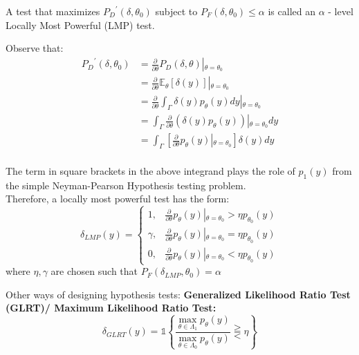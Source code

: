 \documentclass[12pt]{report}
\begin{document}
\begin{defn}
A test that maximizes ${P_D}^\prime(\delta,\theta_0)$ subject to $P_F(\delta,\theta_0) \leq \alpha$ is called an $\alpha$ - level Locally Most Powerful (LMP) test.
\end{defn}

\noindent Observe that:
\begin{align*}
{P_D}^\prime(\delta,\theta_0) &= \frac{\partial}{\partial\theta}P_D(\delta,\theta)\left| {_{\theta = \theta_0}} \right.\\ &= \frac{\partial}{\partial\theta}\mathbb{E}_\theta[\delta(y)]\left| {_{\theta = \theta_0}} \right.\\ &= \frac{\partial}{\partial\theta}\int_{\Gamma}\delta(y)p_\theta(y)dy\left| {_{\theta = \theta_0}} \right.\\ &= \int_{\Gamma}\frac{\partial}{\partial\theta}(\delta(y)p_\theta(y))\left| {_{\theta = \theta_0}} \right.dy\\ &= \int_{\Gamma}\left[\frac{\partial}{\partial\theta}p_\theta(y)\left| {_{\theta = \theta_0}} \right.\right]\delta(y)dy \\
\end{align*}

\noindent The term in square brackets in the above integrand plays the role of $p_1(y)$ from the simple Neyman-Pearson Hypothesis testing problem.
\\
Therefore, a locally most powerful test has the form:
\begin{equation}
\delta_{LMP}(y)=\begin{cases}
 1, & \frac{\partial}{\partial\theta}p_\theta(y)\left| {_{\theta = \theta_0}} \right.>\eta p_{\theta_0}(y)\\
    \gamma, & \frac{\partial}{\partial\theta}p_\theta(y)\left| {_{\theta = \theta_0}} \right.=\eta p_{\theta_0}(y)\\
    0, & \frac{\partial}{\partial\theta}p_\theta(y)\left| {_{\theta = \theta_0}} \right.<\eta p_{\theta_0}(y)
  \end{cases}
\end{equation}
where $\eta, \gamma$ are chosen such that $P_F(\delta_{LMP}, \theta_0) = \alpha$\\

\begin{rem}
Other ways of designing hypothesis tests:
\textbf{Generalized Likelihood Ratio Test (GLRT)/ Maximum Likelihood Ratio Test:}
\begin{equation}
\delta_{GLRT}(y) = \mathds{1} \left\{\frac{\underset{\theta\in\Lambda_1}{\max} p_\theta(y)}{\underset{\theta\in\Lambda_0}{\max} p_\theta(y)} \gtreqqless \eta\right\}
\end{equation}
\end{rem}
\end{document}

